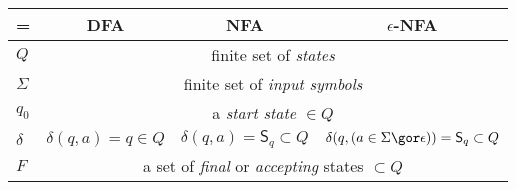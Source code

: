 {\footnotesize
\begin{tabular}{l|c|c|c}
  \hline
 = & DFA & NFA & \(\epsilon\)-NFA\\
  \hline
 \(Q\) & \multicolumn{3}{c}{finite set of \emph{states}}\\
  \hline
 \(\Sigma\) & \multicolumn{3}{c}{finite set of \emph{input symbols}}\\
  \hline
  \(q_{0}\) & \multicolumn{3}{c}{a \emph{start state} \(\in Q\) } \\
  \hline
  \(\delta\) & \(\delta(q,a) = q \in Q\) & \(\delta(q,a) = \mathsf{S}_{q} \subset Q\) & \(\delta(q,(a\in\Sigma\gor\epsilon)) = \mathsf{S}_{q} \subset Q\)\\
  \hline
 \(F\) & \multicolumn{3}{c}{a set of \emph{final} or \emph{accepting} states \(\subset Q\)}\\
\hline
\end{tabular}
}
